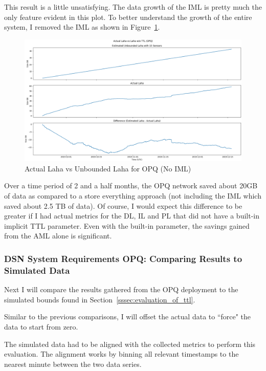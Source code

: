 This result is a little unsatisfying. The data growth of the IML is pretty much the only feature evident in this plot. To better understand the growth of the entire system, I removed the IML as shown in Figure~\ref{fig:actual_laha_vs_unbounded_no_iml_opq}.

\begin{figure}[H]
    \centering
    \includegraphics[width=\linewidth]{figures/actual_laha_vs_unbounded_opq_no_iml.png}
    \caption{Actual Laha vs Unbounded Laha for OPQ (No IML)}
    \label{fig:actual_laha_vs_unbounded_no_iml_opq}
\end{figure}

Over a time period of 2 and a half months, the OPQ network saved about 20GB of data as compared to a store everything approach (not including the IML which saved about 2.5 TB of data). Of course, I would expect this difference to be greater if I had actual metrics for the DL, IL and PL that did not have a built-in implicit TTL parameter. Even with the built-in parameter, the savings gained from the AML alone is significant.

\subsubsection{DSN System Requirements OPQ: Comparing Results to Simulated Data}

Next I will compare the results gathered from the OPQ deployment to the simulated bounds found in Section~\ref{sssec:evaluation_of_ttl}.

Similar to the previous comparisons, I will offset the actual data to ``force" the data to start from zero.

The simulated data had to be aligned with the collected metrics to perform this evaluation. The alignment works by binning all relevant timestamps to the nearest minute between the two data series.

